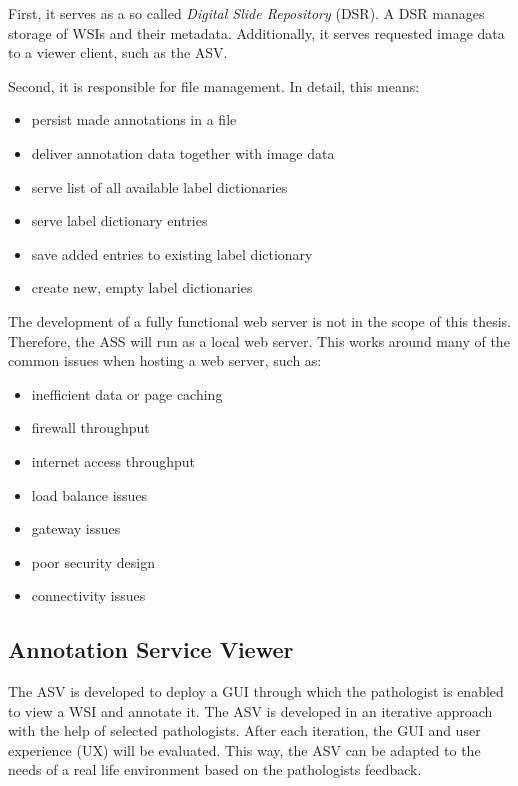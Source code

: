 First, it serves as a so called \emph{Digital Slide Repository} (DSR). A DSR manages storage of WSIs and their metadata. Additionally, it serves requested image data to a viewer client\cite{Cornish13}, such as the ASV. 

Second, it is responsible for file management. In detail, this means:
\begin{itemize}
	\item persist made annotations in a file
	\item deliver annotation data together with image data
	\item serve list of all available label dictionaries
	\item serve label dictionary entries
	\item save added entries to existing label dictionary
	\item create new, empty label dictionaries
\end{itemize} 

The development of a fully functional web server is not in the scope of this thesis. Therefore, the ASS will run as a local web server. This works around many of the common issues when hosting a web server\cite{web:typicalissues}, such as:

\begin{itemize}
	\item inefficient data or page caching
	\item firewall throughput
	\item internet access throughput
	\item load balance issues
	\item gateway issues
	\item poor security design
	\item connectivity issues
\end{itemize}


\subsection{Annotation Service Viewer}
\label{sec4_asvMethod}
The ASV is developed to deploy a GUI through which the pathologist is enabled to view a WSI and annotate it. The ASV is developed in an iterative approach with the help of selected pathologists. After each iteration, the GUI and user experience (UX) will be evaluated. This way, the ASV can be adapted to the needs of a real life environment based on the pathologists feedback.

